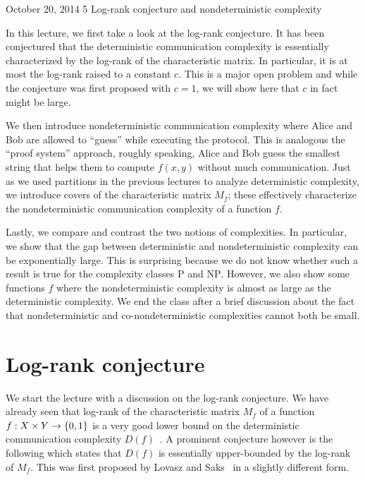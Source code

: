 \documentclass[letterpaper]{article}
\providecommand\cbrac[1]{\ensuremath \left\{#1\right\}}
\newcommand{\X}{X}
\newcommand{\Y}{Y}
\newcommand{\mf}{M_f}
\newcommand{\df}{D(f)}
\renewcommand{\P}{\mathrm{P}}
\newcommand{\NP}{\mathrm{NP}}
\begin{document}
           {October 20, 2014}               %
           {5}                              %
           {Log-rank conjecture and nondeterministic complexity}   %

\noindent

In this lecture, we first take a look at the log-rank conjecture. It has been conjectured that the deterministic communication complexity is essentially characterized by the log-rank of the characteristic matrix. In particular, it is at most the log-rank raised to a constant $c$. This is a major open problem and while the conjecture was first proposed with $c=1$, we will show here that $c$ in fact might be large.

We then introduce nondeterministic communication complexity where Alice and Bob are allowed to ``guess'' while executing the protocol. This is analogous the ``proof system'' approach, roughly speaking, Alice and Bob guess the smallest string that helps them to compute $f(x,y)$ without much communication. Just as we used partitions in the previous lectures to analyze deterministic complexity, we introduce covers of the characteristic matrix $\mf$; these effectively characterize the nondeterministic communication complexity of a function $f$.

Lastly, we compare and contrast the two notions of complexities. In particular, we show that the gap between deterministic and nondeterministic complexity can be exponentially large. This is surprising because we do not know whether such a result is true for the complexity classes $\P$ and $\NP$. However, we also show some functions $f$ where the nondeterministic complexity is almost as large as the deterministic complexity. We end the class after a brief discussion about the fact that nondeterministic and co-nondeterministic complexities cannot both be small.

\section{Log-rank conjecture}
\label{sec:log_rank}

We start the lecture with a discussion on the log-rank conjecture. We have already seen that log-rank of the characteristic matrix $\mf$ of a function $f : \X \times \Y \to \cbrac{0,1}$ is a very good lower bound on the deterministic communication complexity $\df$~\cite{mehlhorn1982vegas}. A prominent conjecture however is the following which states that $\df$ is essentially upper-bounded by the log-rank of $\mf$. This was first proposed by Lovasz and Saks~\cite{lovasz1988lattices} in a slightly different form.
\end{document}
